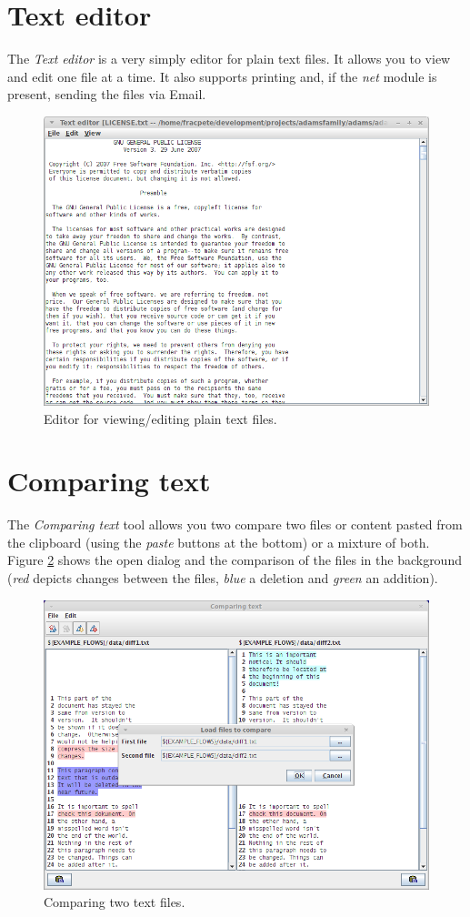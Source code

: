 \section{Text editor}
The \textit{Text editor} is a very simply editor for plain text files. It 
allows you to view and edit one file at a time. It also supports printing
and, if the \textit{net} module is present, sending the files via Email.

\begin{figure}[htb]
  \centering
  \includegraphics[width=12.0cm]{images/texteditor.png}
  \caption{Editor for viewing/editing plain text files.}
  \label{texteditor}
\end{figure}

\clearpage
\newpage
\section{Comparing text}
The \textit{Comparing text} tool allows you two compare two files or content 
pasted from the clipboard (using the \textit{paste} buttons at the bottom) or
a mixture of both. Figure \ref{diff-files} shows the open dialog and the
comparison of the files in the background (\textit{red} depicts changes 
between the files, \textit{blue} a deletion and \textit{green} an addition).

\begin{figure}[htb]
  \centering
  \includegraphics[width=12.0cm]{images/diff-files.png}
  \caption{Comparing two text files.}
  \label{diff-files}
\end{figure}

